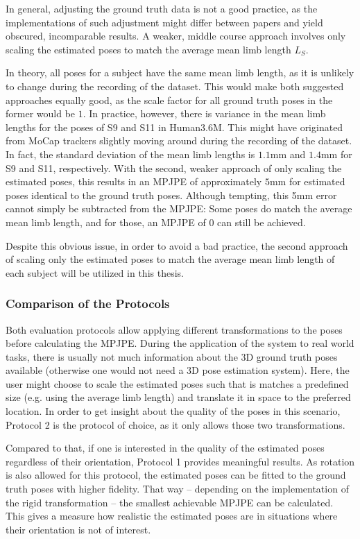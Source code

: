 In general, adjusting the ground truth data is not a good practice, as the implementations of such adjustment might differ between papers and yield obscured, incomparable results.
A weaker, middle course approach involves only scaling the estimated poses to match the average mean limb length $L_S$.

In theory, all poses for a subject have the same mean limb length, as it is unlikely to change during the recording of the dataset.
This would make both suggested approaches equally good, as the scale factor for all ground truth poses in the former would be $1$.
In practice, however, there is variance in the mean limb lengths for the poses of S9 and S11 in Human3.6M.
This might have originated from MoCap trackers slightly moving around during the recording of the dataset.
In fact, the standard deviation of the mean limb lengths is $1.1$mm and $1.4$mm for S9 and S11, respectively.
With the second, weaker approach of only scaling the estimated poses, this results in an MPJPE of approximately $5$mm for estimated poses identical to the ground truth poses.
Although tempting, this 5mm error cannot simply be subtracted from the MPJPE:
Some poses do match the average mean limb length, and for those, an MPJPE of $0$ can still be achieved.

Despite this obvious issue, in order to avoid a bad practice, the second approach of scaling only the estimated poses to match the average mean limb length of each subject will be utilized in this thesis.

\subsubsection{Comparison of the Protocols}

Both evaluation protocols allow applying different transformations to the poses before calculating the MPJPE.
During the application of the system to real world tasks, there is usually not much information about the 3D ground truth poses available (otherwise one would not need a 3D pose estimation system).
Here, the user might choose to scale the estimated poses such that is matches a predefined size (e.g. using the average limb length) and translate it in space to the preferred location.
In order to get insight about the quality of the poses in this scenario, Protocol 2 is the protocol of choice, as it only allows those two transformations.

Compared to that, if one is interested in the quality of the estimated poses regardless of their orientation, Protocol 1 provides meaningful results.
As rotation is also allowed for this protocol, the estimated poses can be fitted to the ground truth poses with higher fidelity.
That way -- depending on the implementation of the rigid transformation -- the smallest achievable MPJPE can be calculated.
This gives a measure how realistic the estimated poses are in situations where their orientation is not of interest.

